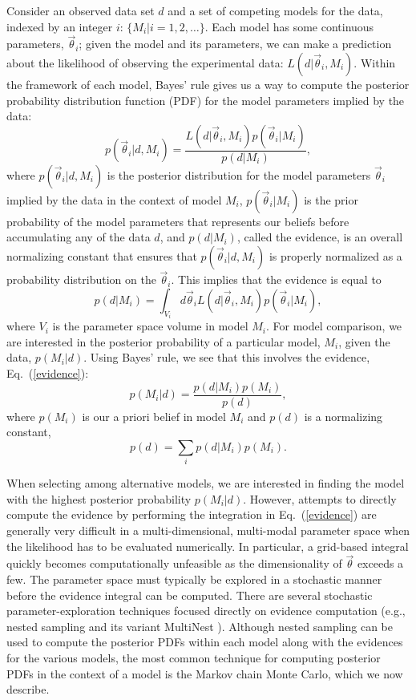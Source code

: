 \documentclass{rsos}
\newcommand{\vtheta}{\vec{\theta}}
\newcommand{\be}{\begin{equation}}
\newcommand{\ee}{\end{equation}}
\newcommand{\bel}[1]{\begin{equation}\label{#1}}
\begin{document}
Consider an observed data set $d$ and a set of competing models for
the data, indexed by an integer $i$: $\{M_i | i = 1, 2, \ldots \}$.
Each model has some continuous parameters, $\vtheta_i$; given the
model and its parameters, we can make a prediction about the
likelihood of observing the experimental data: $L(d|\vtheta_i, M_i)$.
Within the framework of each model, Bayes' rule gives us a way to
compute the posterior probability distribution function (PDF) for the
model parameters implied by the data:
\be
  p(\vtheta_i | d, M_i) = \frac{L(d|\vtheta_i, M_i) p(\vtheta_i|M_i)}{p(d|M_i)},
\ee
where $p(\vtheta_i |d, M_i)$ is the posterior distribution for the
model parameters $\vtheta_i$ implied by the data in the context of
model $M_i$, $p(\vtheta_i|M_i)$ is the prior probability of the model
parameters that represents our beliefs before accumulating any of the
data $d$, and $p(d|M_i)$, called the evidence, is an overall
normalizing constant that ensures that $p(\vtheta_i|d,M_i)$ is
properly normalized as a probability distribution on the $\vtheta_i$.
This implies that the evidence is equal to
\bel{evidence}
  p(d|M_i) = \int_{V_i} d\vtheta_i L(d|\vtheta_i, M_i) p(\vtheta_i|M_i),
\ee
where $V_i$ is the parameter space volume in model $M_i$.  For model
comparison, we are interested in the posterior probability of a
particular model, $M_i$, given the data, $p(M_i|d)$.  Using Bayes'
rule, we see that this involves the evidence, Eq.~(\ref{evidence}):
\be
p(M_i|d) = \frac{p(d|M_i) p(M_i)}{p(d)},
\ee
where $p(M_i)$ is our a priori belief in model $M_i$ and $p(d)$ is a
normalizing constant,
\be
p(d)=\sum_i p(d|M_i) p(M_i).
\ee

When selecting among alternative models, we are interested in finding
the model with the highest posterior probability $p(M_i|d)$.  However,
attempts to directly compute the evidence by performing the
integration in Eq.~(\ref{evidence}) are generally very difficult in a
multi-dimensional, multi-modal parameter space when the likelihood has
to be evaluated numerically.  In particular, a grid-based integral
quickly becomes computationally unfeasible as the dimensionality of
$\vtheta$ exceeds a few.  The parameter space must typically be
explored in a stochastic manner before the evidence integral can be
computed.  There are several stochastic parameter-exploration
techniques focused directly on evidence computation (e.g., nested
sampling \cite{Skilling:2004,Skilling:2006} and its variant MultiNest
\cite{Feroz:2009}).  Although nested sampling can be used to compute
the posterior PDFs within each model along with the evidences for the
various models, the most common technique for computing posterior PDFs
in the context of a model is the Markov chain Monte Carlo, which we
now describe.
\end{document}
